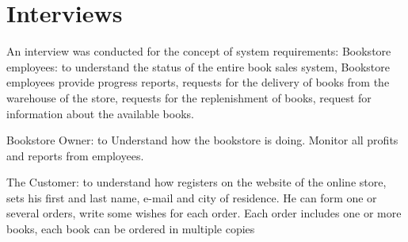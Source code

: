 \section{Interviews}

An interview was conducted for the concept of system requirements:
Bookstore employees: to understand the status of the entire book sales system, Bookstore employees provide progress reports, requests for the delivery of books from the warehouse of the store, requests for the replenishment of books, request for information about the available books.


Bookstore Owner: to Understand how the bookstore is doing. Monitor all profits and reports from employees.

The Customer: to understand how registers on the website of the online store, sets his first and last name, e-mail and city of residence. He can form one or several orders, write some wishes for each order. Each order includes one or more books, each book can be ordered in multiple copies

